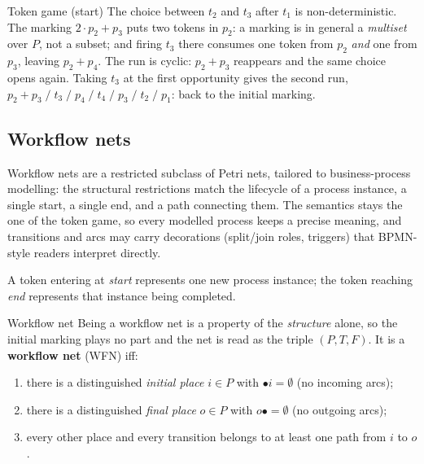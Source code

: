 \begin{examplebox}{Token game (start)}
\medskip
The choice between $t_2$ and $t_3$ after $t_1$ is non-deterministic. The marking $2\cdot p_2+p_3$ puts two tokens in $p_2$: a marking is in general a \emph{multiset} over $P$, not a subset; and firing $t_3$ there consumes one token from $p_2$ \emph{and} one from $p_3$, leaving $p_2+p_4$. The run is cyclic: $p_2+p_3$ reappears and the same choice opens again. Taking $t_3$ at the first opportunity gives the second run, $p_2+p_3 \;/\; t_3 \;/\; p_4 \;/\; t_4 \;/\; p_3 \;/\; t_2 \;/\; p_1$: back to the initial marking.
\end{examplebox}

\subsection{Workflow nets}

Workflow nets are a restricted subclass of Petri nets, tailored to business-process modelling: the structural restrictions match the lifecycle of a process instance, a single start, a single end, and a path connecting them. The semantics stays the one of the token game, so every modelled process keeps a precise meaning, and transitions and arcs may carry decorations (split/join roles, triggers) that BPMN-style readers interpret directly.

\medskip
\begin{center}
\end{center}

A token entering at \emph{start} represents one new process instance; the token reaching \emph{end} represents that instance being completed.

\begin{definitionbox}{Workflow net}
Being a workflow net is a property of the \emph{structure} alone, so the initial marking plays no part and the net is read as the triple $(P, T, F)$. It is a \textbf{workflow net} (WFN) iff:
\begin{enumerate}
  \item there is a distinguished \emph{initial place} $i \in P$ with $\bullet i = \emptyset$ (no incoming arcs);
  \item there is a distinguished \emph{final place} $o \in P$ with $o \bullet = \emptyset$ (no outgoing arcs);
  \item every other place and every transition belongs to at least one path from $i$ to $o$.
\end{enumerate}
\end{definitionbox}


